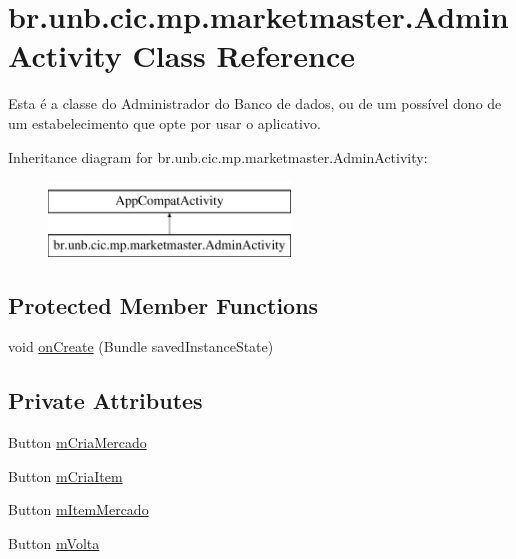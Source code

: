 \hypertarget{classbr_1_1unb_1_1cic_1_1mp_1_1marketmaster_1_1AdminActivity}{}\section{br.\+unb.\+cic.\+mp.\+marketmaster.\+Admin\+Activity Class Reference}
\label{classbr_1_1unb_1_1cic_1_1mp_1_1marketmaster_1_1AdminActivity}


Esta é a classe do Administrador do Banco de dados, ou de um possível dono de um estabelecimento que opte por usar o aplicativo.  


Inheritance diagram for br.\+unb.\+cic.\+mp.\+marketmaster.\+Admin\+Activity\+:\begin{figure}[H]
\begin{center}
\leavevmode
\includegraphics[height=2.000000cm]{classbr_1_1unb_1_1cic_1_1mp_1_1marketmaster_1_1AdminActivity}
\end{center}
\end{figure}
\subsection*{Protected Member Functions}
\begin{DoxyCompactItemize}
\item 
void \mbox{\hyperlink{classbr_1_1unb_1_1cic_1_1mp_1_1marketmaster_1_1AdminActivity_a63121fa845d071bf13b86a8c2b539ec6}{on\+Create}} (Bundle saved\+Instance\+State)
\end{DoxyCompactItemize}
\subsection*{Private Attributes}
\begin{DoxyCompactItemize}
\item 
Button \mbox{\hyperlink{classbr_1_1unb_1_1cic_1_1mp_1_1marketmaster_1_1AdminActivity_a6e7fe5fa0008fea1df0890610f41ce3a}{m\+Cria\+Mercado}}
\item 
Button \mbox{\hyperlink{classbr_1_1unb_1_1cic_1_1mp_1_1marketmaster_1_1AdminActivity_aaccaaf23fed7cae353fe186f75fd343a}{m\+Cria\+Item}}
\item 
Button \mbox{\hyperlink{classbr_1_1unb_1_1cic_1_1mp_1_1marketmaster_1_1AdminActivity_aba3cb85562a7921cd96103acf110be57}{m\+Item\+Mercado}}
\item 
Button \mbox{\hyperlink{classbr_1_1unb_1_1cic_1_1mp_1_1marketmaster_1_1AdminActivity_af987b468f4a80564c50f9f0b21036372}{m\+Volta}}
\end{DoxyCompactItemize}


